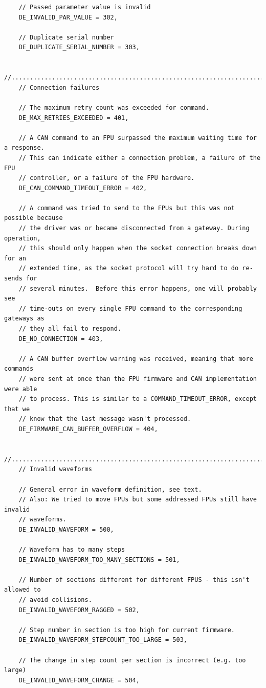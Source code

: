 \documentclass[fontsize=12,a4paper]{scrreprt}
\begin{document}
\begin{verbatim}
    // Passed parameter value is invalid
    DE_INVALID_PAR_VALUE = 302,

    // Duplicate serial number
    DE_DUPLICATE_SERIAL_NUMBER = 303,

    //..........................................................................
    // Connection failures

    // The maximum retry count was exceeded for command.
    DE_MAX_RETRIES_EXCEEDED = 401,

    // A CAN command to an FPU surpassed the maximum waiting time for a response.
    // This can indicate either a connection problem, a failure of the FPU
    // controller, or a failure of the FPU hardware.
    DE_CAN_COMMAND_TIMEOUT_ERROR = 402,

    // A command was tried to send to the FPUs but this was not possible because
    // the driver was or became disconnected from a gateway. During operation,
    // this should only happen when the socket connection breaks down for an
    // extended time, as the socket protocol will try hard to do re-sends for
    // several minutes.  Before this error happens, one will probably see
    // time-outs on every single FPU command to the corresponding gateways as
    // they all fail to respond.
    DE_NO_CONNECTION = 403,

    // A CAN buffer overflow warning was received, meaning that more commands
    // were sent at once than the FPU firmware and CAN implementation were able
    // to process. This is similar to a COMMAND_TIMEOUT_ERROR, except that we
    // know that the last message wasn't processed.
    DE_FIRMWARE_CAN_BUFFER_OVERFLOW = 404,

    //..........................................................................
    // Invalid waveforms

    // General error in waveform definition, see text.
    // Also: We tried to move FPUs but some addressed FPUs still have invalid
    // waveforms.
    DE_INVALID_WAVEFORM = 500,

    // Waveform has to many steps
    DE_INVALID_WAVEFORM_TOO_MANY_SECTIONS = 501,

    // Number of sections different for different FPUS - this isn't allowed to 
    // avoid collisions.
    DE_INVALID_WAVEFORM_RAGGED = 502,

    // Step number in section is too high for current firmware.
    DE_INVALID_WAVEFORM_STEPCOUNT_TOO_LARGE = 503,

    // The change in step count per section is incorrect (e.g. too large)
    DE_INVALID_WAVEFORM_CHANGE = 504,


\end{verbatim}
\end{document}
